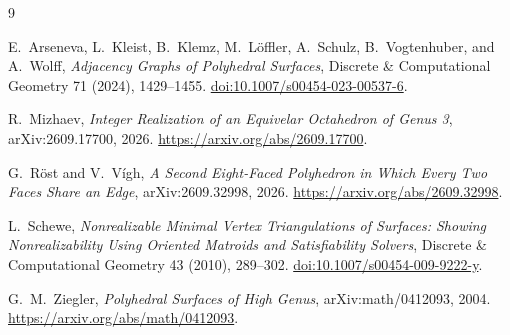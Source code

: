 \documentclass[11pt,a4paper]{article}
\theoremstyle{definition}
\begin{document}
\begin{thebibliography}{9}

E.~Arseneva, L.~Kleist, B.~Klemz, M.~L\"offler, A.~Schulz,
B.~Vogtenhuber, and A.~Wolff,
\emph{Adjacency Graphs of Polyhedral Surfaces},
Discrete \& Computational Geometry 71 (2024), 1429--1455.
\href{https://doi.org/10.1007/s00454-023-00537-6}{doi:10.1007/s00454-023-00537-6}.

R.~Mizhaev,
\emph{Integer Realization of an Equivelar Octahedron of Genus 3},
arXiv:2609.17700, 2026.
\url{https://arxiv.org/abs/2609.17700}.

G.~R\"ost and V.~V\'igh,
\emph{A Second Eight-Faced Polyhedron in Which Every Two Faces Share an Edge},
arXiv:2609.32998, 2026.
\url{https://arxiv.org/abs/2609.32998}.

L.~Schewe,
\emph{Nonrealizable Minimal Vertex Triangulations of Surfaces: Showing
Nonrealizability Using Oriented Matroids and Satisfiability Solvers},
Discrete \& Computational Geometry 43 (2010), 289--302.
\href{https://doi.org/10.1007/s00454-009-9222-y}{doi:10.1007/s00454-009-9222-y}.

G.~M.~Ziegler,
\emph{Polyhedral Surfaces of High Genus},
arXiv:math/0412093, 2004.
\url{https://arxiv.org/abs/math/0412093}.

\end{thebibliography}
\end{document}
